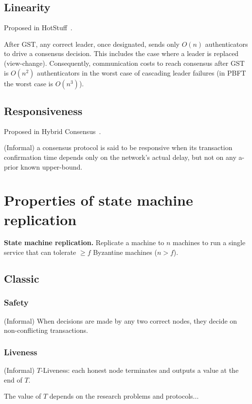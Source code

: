 \documentclass[runningheads]{llncs}
\begin{document}
\subsection{Linearity}
Proposed in HotStuff~\cite{yin2019hotstuff}.

After GST, any correct leader, once designated, sends only $O(n)$ authenticators to drive a consensus decision. This includes the case where a leader is replaced (view-change).
Consequently, communication costs to reach consensus after GST is $O(n^2)$ authenticators in the worst case of cascading leader failures (in PBFT the worst case is $O(n^3)$).


\subsection{Responsiveness}
Proposed in Hybrid Consensus~\cite{pass2017hybrid}.

(Informal) a consensus protocol is said to be responsive when its transaction confirmation time depends only on the network’s actual delay, but not on any a-prior known upper-bound.




\section{Properties of state machine replication}

\textbf{State machine replication.}
Replicate a machine to $n$ machines to run a single service that can tolerate $\geq f$ Byzantine machines ($n > f$).

\subsection{Classic}

\subsubsection{Safety}
(Informal) When decisions are made by any two correct nodes, they decide on non-conflicting transactions.

\subsubsection{Liveness}
(Informal) $T$-Liveness: each honest node terminates and outputs a value at the end of $T$.

The value of $T$ depends on the research problems and protocols...
\end{document}
